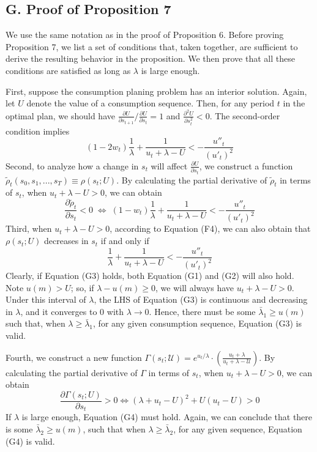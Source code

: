 \hypertarget{g.-proof-of-proposition-7}{%
\subsection*{G. Proof of Proposition
7}\label{g.-proof-of-proposition-7}}

We use the same notation as in the proof of Proposition 6. Before
proving Proposition 7, we list a set of conditions that, taken together,
are sufficient to derive the resulting behavior in the proposition. We
then prove that all these conditions are satisfied as long as
\(\lambda\) is large enough.

First, suppose the consumption planing problem has an interior solution.
Again, let \(U\) denote the value of a consumption sequence. Then, for
any period \(t\) in the optimal plan, we should have
\(\frac{\partial U}{\partial s_{t+1}}/\frac{\partial U}{\partial s_{t}}=1\)
and \(\frac{\partial^2 U}{\partial s_t^2}<0\). The second-order
condition
implies\[\tag{G1} (1-2w_t)\frac{1}{\lambda} + \frac{1}{u_t+\lambda-U} < -\frac{u''_t}{(u'_t)^2}  \]Second,
to analyze how a change in \(s_t\) will affect
\(\frac{\partial U}{\partial s_t}\), we construct a function
\(\tilde{\rho}_t(s_0,s_1,...,s_T)\equiv\rho(s_t;U)\). By calculating the
partial derivative of \(\tilde{\rho}_t\) in terms of \(s_t\), when
\(u_t+\lambda-U>0\), we can
obtain\[\tag{G2} \frac{\partial \tilde{\rho}_t}{\partial s_t} <0 \;\Longleftrightarrow\; (1-w_t)\frac{1}{\lambda}+\frac{1}{u_t+\lambda-U}<-\frac{u''_t}{(u'_t)^2} \]Third,
when \(u_t+\lambda-U>0\), according to Equation (F4), we can also obtain
that \(\rho(s_t;U)\) decreases in \(s_t\) if and only
if\[\tag{G3} \frac{1}{\lambda}+\frac{1}{u_t+\lambda-U}<-\frac{u''_t}{(u'_t)^2} \]Clearly,
if Equation (G3) holds, both Equation (G1) and (G2) will also hold. Note
\(u(m)>U\); so, if \(\lambda - u(m)\geq 0\), we will always have
\(u_t+\lambda-U>0\). Under this interval of \(\lambda\), the LHS of
Equation (G3) is continuous and decreasing in \(\lambda\), and it
converges to 0 with \(\lambda \rightarrow 0\). Hence, there must be some
\(\bar{\lambda}_1 \geq u(m)\) such that, when
\(\lambda\geq \bar{\lambda}_1\), for any given consumption sequence,
Equation (G3) is valid.

Fourth, we construct a new function
\(\Gamma(s_t;\mathcal{U})=e^{u_t/\lambda}\cdot\left(\frac{u_t+\lambda}{u_t+\lambda -\mathcal{U}}\right)\).
By calculating the partial derivative of \(\Gamma\) in terms of \(s_t\),
when \(u_t+\lambda-U>0\), we can obtain\[
\tag{G4} \frac{\partial\Gamma(s_t;U)}{\partial s_t}>0 \Longleftrightarrow (\lambda +u_t-U)^2+U(u_t-U)>0
\]If \(\lambda\) is large enough, Equation (G4) must hold. Again, we can
conclude that there is some \(\bar{\lambda}_2\geq u(m)\), such that when
\(\lambda \geq \bar{\lambda}_2\), for any given sequence, Equation (G4)
is valid.

